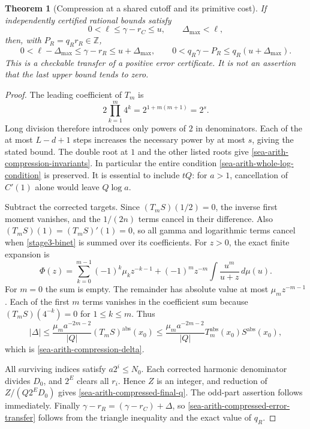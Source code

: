 \documentclass[11pt,a4paper]{article}
\newtheorem{theorem}{Theorem}[section]
\theoremstyle{definition}
\theoremstyle{remark}
\begin{document}
\begin{theorem}[Compression at a shared cutoff and its primitive cost]
If independently certified rational bounds satisfy
\[
 0<\ell\le\gamma-r_C\le u,\qquad \Delta_{\max}<\ell,
\]
then, with $P_R=q_Rr_R\in\mathbb Z$,
\begin{equation}
 0<\ell-\Delta_{\max}\le\gamma-r_R\le u+\Delta_{\max},\qquad
 0<q_R\gamma-P_R\le q_R(u+\Delta_{\max}).
 \label{sea-arith-compressed-error-transfer}
\end{equation}
This is a checkable transfer of a positive error certificate. It is not
an assertion that the last upper bound tends to zero.
\end{theorem}

\begin{proof}
The leading coefficient of $T_m$ is
\[
 2\prod_{k=1}^m4^k=2^{1+m(m+1)}=2^s.
\]
Long division therefore introduces only powers of $2$ in denominators.
Each of the at most $L-d+1$ steps increases the necessary power by at
most $s$, giving the stated bound. The double root at $1$ and the other
listed roots give \eqref{sea-arith-compression-invariants}. In particular
the entire condition \eqref{sea-arith-whole-log-condition} is preserved.
It is essential to include $tQ$: for $a>1$, cancellation of $C'(1)$
alone would leave $Q\log a$.

Subtract the corrected targets. Since $(T_mS)(1/2)=0$, the inverse first
moment vanishes, and the $1/(2n)$ terms cancel in their difference.
Also $(T_mS)(1)=(T_mS)'(1)=0$, so all gamma and logarithmic terms cancel
when \eqref{stage3-binet} is summed over its coefficients.
For $z>0$, the exact finite expansion is
\[
 \Phi(z)=\sum_{k=0}^{m-1}(-1)^k\mu_kz^{-k-1}
    +(-1)^mz^{-m}\int\frac{u^m}{u+z}\,d\mu(u).
\]
For $m=0$ the sum is empty. The remainder has absolute value at most
$\mu_mz^{-m-1}$. Each of the first $m$ terms vanishes in the coefficient
sum because $(T_mS)(4^{-k})=0$ for $1\le k\le m$. Thus
\[
 |\Delta|\le
 \frac{\mu_ma^{-2m-2}}{|Q|}(T_mS)^{\mathrm{abs}}(x_0)
 \le\frac{\mu_ma^{-2m-2}}{|Q|}
        T_m^{\mathrm{abs}}(x_0)S^{\mathrm{abs}}(x_0),
\]
which is \eqref{sea-arith-compression-delta}.

All surviving indices satisfy $a2^i\le N_0$. Each corrected harmonic
denominator divides $D_0$, and $2^E$ clears all $r_i$. Hence $Z$ is an
integer, and reduction of $Z/(Q2^ED_0)$ gives
\eqref{sea-arith-compressed-final-q}. The odd-part assertion follows
immediately. Finally
$\gamma-r_R=(\gamma-r_C)+\Delta$, so
\eqref{sea-arith-compressed-error-transfer} follows from the triangle
inequality and the exact value of $q_R$.
\end{proof}
\end{document}
